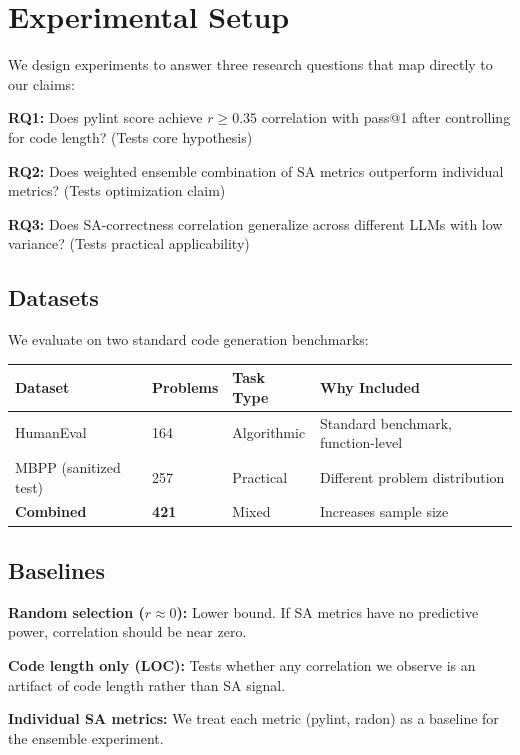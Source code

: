 \section{Experimental Setup}
\label{sec:experiments}

We design experiments to answer three research questions that map directly to our claims:

\textbf{RQ1:} Does pylint score achieve $r\geq0.35$ correlation with pass@1 after controlling for code length? (Tests core hypothesis)

\textbf{RQ2:} Does weighted ensemble combination of SA metrics outperform individual metrics? (Tests optimization claim)

\textbf{RQ3:} Does SA-correctness correlation generalize across different LLMs with low variance? (Tests practical applicability)

\subsection{Datasets}

We evaluate on two standard code generation benchmarks:

\begin{table}[h]
\centering
\begin{tabular}{@{}llll@{}}
\toprule
Dataset & Problems & Task Type & Why Included \\
\midrule
HumanEval & 164 & Algorithmic & Standard benchmark, function-level \\
MBPP (sanitized test) & 257 & Practical & Different problem distribution \\
\textbf{Combined} & \textbf{421} & Mixed & Increases sample size \\
\bottomrule
\end{tabular}
\end{table}

\subsection{Baselines}

\textbf{Random selection ($r\approx0$):} Lower bound. If SA metrics have no predictive power, correlation should be near zero.

\textbf{Code length only (LOC):} Tests whether any correlation we observe is an artifact of code length rather than SA signal.

\textbf{Individual SA metrics:} We treat each metric (pylint, radon) as a baseline for the ensemble experiment.

